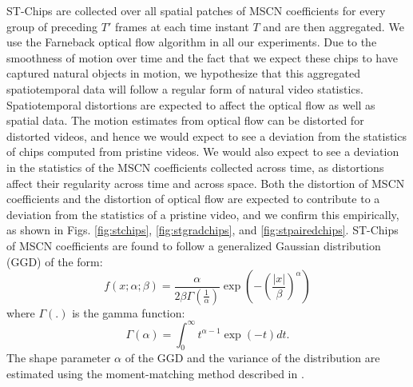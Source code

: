 \documentclass[conference]{IEEEtran}
\begin{document}
  ST-Chips are collected over all spatial patches of MSCN coefficients for every group of preceding $T'$ frames at each time instant $T$ and are then aggregated. We use the Farneback\cite{farneback} optical flow algorithm in all our experiments. Due to the smoothness of motion over time and the fact that we expect these chips to have captured natural objects in motion, we hypothesize that this aggregated spatiotemporal data will follow a regular form of natural video statistics. Spatiotemporal distortions are expected to affect the optical flow as well as spatial data. The motion estimates from optical flow can be distorted for distorted videos, and hence we would expect to see a deviation from the statistics of chips computed from pristine videos. We would also expect to see a deviation in the statistics of the MSCN coefficients collected across time, as distortions affect their regularity across time and across space. Both the distortion of MSCN coefficients and the distortion of optical flow are expected to contribute to a deviation from the statistics of a pristine video, and we confirm this empirically, as shown in Figs. \ref{fig:stchips}, \ref{fig:stgradchips}, and \ref{fig:stpairedchips}. ST-Chips of MSCN coefficients are found to follow a generalized Gaussian distribution (GGD) of the form:
  \begin{equation}
  f(x;\alpha;\beta) = \frac{\alpha}{2\beta \Gamma(\frac{1}{\alpha})} \exp (-(\frac{|x|}{\beta})^\alpha)
  \end{equation}
where $\Gamma(.)$ is the gamma function:
\begin{equation}
\Gamma(\alpha) = \int_0^\infty t^{\alpha-1} \exp(-t) dt.
\end{equation}
The shape parameter $\alpha$ of the GGD and the variance of the distribution are estimated using the moment-matching method described in \cite{estimation}.
\end{document}
